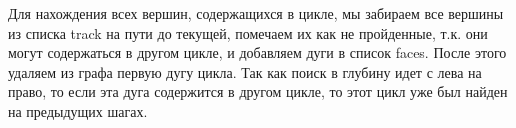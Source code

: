 Для нахождения всех вершин, содержащихся в цикле, мы забираем все вершины из списка track на пути до текущей, помечаем их как не пройденные, т.к. они могут содержаться в другом цикле, и добавляем дуги в список faces. После этого удаляем из графа первую дугу цикла. Так как поиск в глубину идет с лева на право, то если эта дуга содержится в другом цикле, то этот цикл уже был найден на предыдущих шагах. 

\begin{figure}
	\begin{minipage}[H]{0.49\linewidth}
	\end{minipage}
	\hfill
	\begin{minipage}[H]{0.49\linewidth}
	\end{minipage}
	\hfill
	\begin{minipage}[H]{0.49\linewidth}

\end{minipage}
\end{figure}
